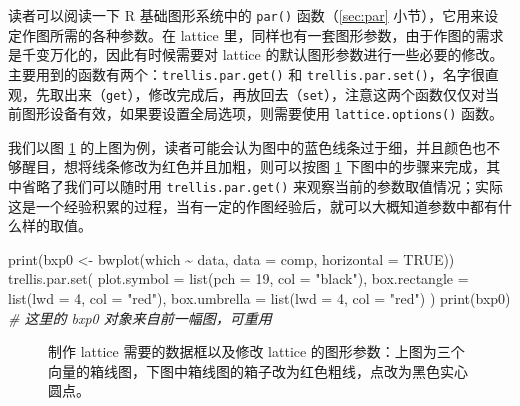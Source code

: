 \documentclass[
  b5paper,
  UTF8,twoside]{book}
\newenvironment{Shaded}{\begin{snugshade}}{\end{snugshade}}
\newcommand{\AttributeTok}[1]{\textcolor[rgb]{0.77,0.63,0.00}{#1}}
\newcommand{\CommentTok}[1]{\textcolor[rgb]{0.56,0.35,0.01}{\textit{#1}}}
\newcommand{\ConstantTok}[1]{\textcolor[rgb]{0.00,0.00,0.00}{#1}}
\newcommand{\DecValTok}[1]{\textcolor[rgb]{0.00,0.00,0.81}{#1}}
\newcommand{\FunctionTok}[1]{\textcolor[rgb]{0.00,0.00,0.00}{#1}}
\newcommand{\NormalTok}[1]{#1}
\newcommand{\OtherTok}[1]{\textcolor[rgb]{0.56,0.35,0.01}{#1}}
\newcommand{\SpecialCharTok}[1]{\textcolor[rgb]{0.00,0.00,0.00}{#1}}
\newcommand{\StringTok}[1]{\textcolor[rgb]{0.31,0.60,0.02}{#1}}
\begin{document}
读者可以阅读一下 R 基础图形系统中的 \texttt{par()} 函数（\ref{sec:par} 小节），它用来设定作图所需的各种参数。在 lattice 里，同样也有一套图形参数，由于作图的需求是千变万化的，因此有时候需要对 lattice 的默认图形参数进行一些必要的修改。主要用到的函数有两个：\texttt{trellis.par.get()} 和 \texttt{trellis.par.set()}，名字很直观，先取出来（\texttt{get}），修改完成后，再放回去（\texttt{set}），注意这两个函数仅仅对当前图形设备有效，如果要设置全局选项，则需要使用 \texttt{lattice.options()} 函数。

我们以图 \ref{fig:lattice-data-par} 的上图为例，读者可能会认为图中的蓝色线条过于细，并且颜色也不够醒目，想将线条修改为红色并且加粗，则可以按图 \ref{fig:lattice-data-par} 下图中的步骤来完成，其中省略了我们可以随时用 \texttt{trellis.par.get()} 来观察当前的参数取值情况；实际这是一个经验积累的过程，当有一定的作图经验后，就可以大概知道参数中都有什么样的取值。

\begin{Shaded}
\begin{Highlighting}[]
\FunctionTok{print}\NormalTok{(bxp0 }\OtherTok{\textless{}{-}} \FunctionTok{bwplot}\NormalTok{(which }\SpecialCharTok{\textasciitilde{}}\NormalTok{ data, }\AttributeTok{data =}\NormalTok{ comp, }\AttributeTok{horizontal =} \ConstantTok{TRUE}\NormalTok{))}
\FunctionTok{trellis.par.set}\NormalTok{(}
  \AttributeTok{plot.symbol =} \FunctionTok{list}\NormalTok{(}\AttributeTok{pch =} \DecValTok{19}\NormalTok{, }\AttributeTok{col =} \StringTok{"black"}\NormalTok{),}
  \AttributeTok{box.rectangle =} \FunctionTok{list}\NormalTok{(}\AttributeTok{lwd =} \DecValTok{4}\NormalTok{, }\AttributeTok{col =} \StringTok{"red"}\NormalTok{),}
  \AttributeTok{box.umbrella =} \FunctionTok{list}\NormalTok{(}\AttributeTok{lwd =} \DecValTok{4}\NormalTok{, }\AttributeTok{col =} \StringTok{"red"}\NormalTok{)}
\NormalTok{)}
\FunctionTok{print}\NormalTok{(bxp0) }\CommentTok{\# 这里的 bxp0 对象来自前一幅图，可重用}
\end{Highlighting}
\end{Shaded}

\begin{figure}

{\centering {}\newline{}

}

\caption[制作 lattice 需要的数据框以及修改 lattice 的图形参数]{制作 lattice 需要的数据框以及修改 lattice 的图形参数：上图为三个向量的箱线图，下图中箱线图的箱子改为红色粗线，点改为黑色实心圆点。}\label{fig:lattice-data-par}
\end{figure}
\end{document}
